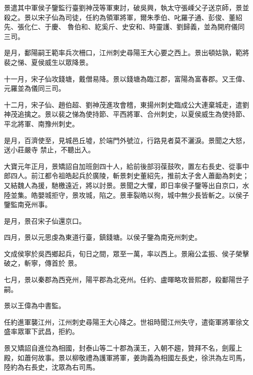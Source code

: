 \begin{pinyinscope}
 景遣其中軍侯子鑒監行臺劉神茂等軍東討，破吳興，執太守張嵊父子送京師，景並殺之。景以宋子仙為司徒，任約為領軍將軍，爾朱季伯、叱羅子通、彭俊、董紹先、張化仁、于慶、
 魯伯和、紇奚斤、史安和、時靈護、劉歸義，並為開府儀同三司。



 是月，鄱陽嗣王範率兵次柵口，江州刺史尋陽王大心要之西上。景出頓姑孰，範將裴之悌、夏侯威生以眾降景。



 十一月，宋子仙攻錢塘，戴僧易降。景以錢塘為臨江郡，富陽為富春郡。又王偉、元羅並為儀同三司。



 十二月，宋子仙、趙伯超、劉神茂進攻會稽，東揚州刺史臨成公大連棄城走，遣劉神茂追擒之。景以裴之悌為使持節、平西將軍、合州刺史，以夏侯威生為使持節、平北將軍、南豫州刺史。



 是月，百濟使至，見城邑丘墟，於端門外號泣，行路見者莫不灑淚。景聞之大怒，送小莊嚴寺
 禁止，不聽出入。



 大寶元年正月，景矯詔自加班劍四十人，給前後部羽葆鼓吹，置左右長史、從事中郎四人。前江都令祖皓起兵於廣陵，斬景刺史董紹先，推前太子舍人蕭勔為刺史；又結魏人為援，馳檄遠近，將以討景。景聞之大懼，即日率侯子鑒等出自京口，水陸並集。皓嬰城拒守，景攻城，陷之。景車裂皓以徇，城中無少長皆斬之。以侯子鑒監南兗州事。



 是月，景召宋子仙還京口。



 四月，景以元思虔為東道行臺，鎮錢塘。以侯子鑒為南兗州刺史。



 文成侯寧於吳西鄉起兵，旬日之間，眾至一萬，率以西上。景廂公孟振、侯子榮擊破之，斬寧，傳首於
 景。



 七月，景以秦郡為西兗州，陽平郡為北兗州。任約、盧暉略攻晉熙郡，殺鄱陽世子嗣。



 景以王偉為中書監。



 任約進軍襲江州，江州刺史尋陽王大心降之。世祖時聞江州失守，遣衛軍將軍徐文盛率眾軍下武昌，拒約。



 景又矯詔自進位為相國，封泰山等二十郡為漢王，入朝不趨，贊拜不名，劍履上殿，如蕭何故事。景以柳敬禮為護軍將軍，姜詢義為相國左長史，徐洪為左司馬，陸約為右長史，沈眾為右司馬。




\end{pinyinscope}
